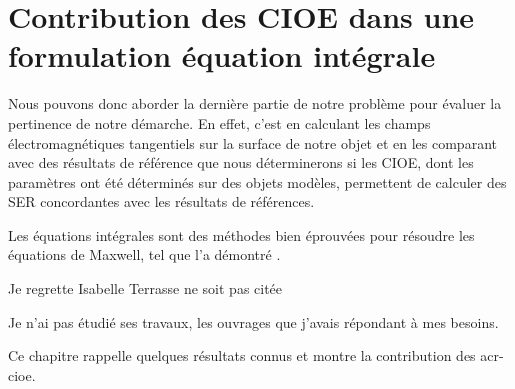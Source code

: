 \chapter{Contribution des CIOE dans une formulation équation intégrale}
\label{sec:equation_integrale}
\minitoc
\newpage
{}
Nous pouvons donc aborder la dernière partie de notre problème pour évaluer la pertinence de notre démarche.
En effet, c'est en calculant les champs électromagnétiques tangentiels sur la surface de notre objet et en les comparant avec des résultats de référence que nous déterminerons si les CIOE, dont les paramètres ont été déterminés sur des objets modèles, permettent de calculer des SER concordantes avec les résultats de références.

Les équations intégrales sont des méthodes bien éprouvées pour résoudre les équations de Maxwell, tel que l'a démontré \cite{nedelec_acoustic_2001}.
\begin{REM}
  Je regrette Isabelle Terrasse ne soit pas citée
\end{REM}
\begin{REP}
  Je n'ai pas étudié ses travaux, les ouvrages que j'avais répondant à mes besoins.
\end{REP}
Ce chapitre rappelle quelques résultats connus et montre la contribution des \gls{acr-cioe}.




